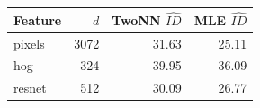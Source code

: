 \begin{tabular}{lrrr}
\toprule
Feature & $d$ & TwoNN $\hat{ID}$ & MLE $\hat{ID}$ \\
\midrule
pixels & 3072 & 31.63 & 25.11 \\
hog & 324 & 39.95 & 36.09 \\
resnet & 512 & 30.09 & 26.77 \\
\bottomrule
\end{tabular}
